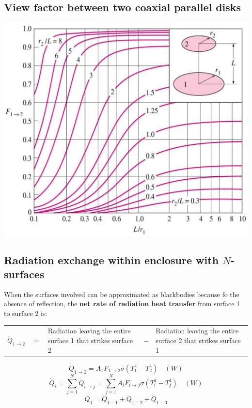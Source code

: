 \documentclass[11pt]{article}
\begin{document}
\subsection{View factor between two coaxial parallel disks}
\label{sec:org62e4f7e}
\begin{center}
\includegraphics[width=.9\linewidth]{./images/view-factors-between-two-coaxial-parallel-disks-graph.png}
\end{center}

 \newpage
\subsection{Radiation exchange within enclosure with \(N\)-surfaces}
\label{sec:orgcf8f1d9}
When the surfaces involved can be approximated as blackbodies because fo the absence of reflection, the \textbf{net rate of radiation heat transfer} from surface 1 to surface 2 is:
\begin{center}
\begin{tabular}{>{\centering\arraybackslash}m{3em} >{\centering\arraybackslash}m{1em} >{\centering\arraybackslash}m{10em} >{\centering\arraybackslash}m{1em} >{\centering\arraybackslash}m{10em}}
\(\dot{Q}_{1 \rightarrow 2}\) & \(=\) & Radiation leaving the entire surface 1 that strikes surface 2 & \(-\) & Radiation leaving the entire surface 2 that strikes surface 1\\
\end{tabular}
\end{center}

\[\dot{Q}_{1 \rightarrow 2} = A_1 F_{1 \rightarrow 2} \sigma (T_1^4 - T_2^4) \quad (\unit{W})\]
\[\dot{Q}_i = \sum_{j=1}^N \dot{Q}_{i \rightarrow j} = \sum_{j=1}^N A_i F_{i \rightarrow j} \sigma (T_i^4 - T_j^4) \quad (\unit{W}) \]
\[\dot{Q}_1 = \dot{Q}_{1-1} + \dot{Q}_{1-2} + \dot{Q}_{1-3}\]
\end{document}
